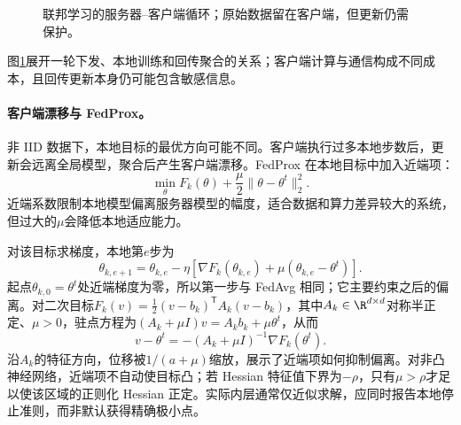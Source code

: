 \begin{figure}[htbp]
\centering
{}
\caption{联邦学习的服务器--客户端循环；原始数据留在客户端，但更新仍需保护。}
\label{fig:federated-training-round}
\end{figure}
图\ref{fig:federated-training-round}展开一轮下发、本地训练和回传聚合的关系；客户端计算与通信构成不同成本，且回传更新本身仍可能包含敏感信息。

\paragraph{客户端漂移与 FedProx。}
非 IID 数据下，本地目标的最优方向可能不同。客户端执行过多本地步数后，更新会远离全局模型，聚合后产生客户端漂移。FedProx 在本地目标中加入近端项：
\begin{equation}
 \min_\theta F_k(\theta)+\frac{\mu}{2}\|\theta-\theta^t\|_2^2.
\end{equation}
近端系数限制本地模型偏离服务器模型的幅度，适合数据和算力差异较大的系统，但过大的$\mu$会降低本地适应能力。

对该目标求梯度，本地第$e$步为
\begin{equation}
 \theta_{k,e+1}=\theta_{k,e}-\eta
 [\nabla F_k(\theta_{k,e})+\mu(\theta_{k,e}-\theta^t)].
\end{equation}
起点$\theta_{k,0}=\theta^t$处近端梯度为零，所以第一步与 FedAvg 相同；它主要约束之后的偏离。对二次目标$F_k(v)=\tfrac12(v-b_k)^{\mathsf T}A_k(v-b_k)$，其中$A_k\in\R^{d\times d}$对称半正定、$\mu>0$，驻点方程为$(A_k+\mu I)v=A_kb_k+\mu\theta^t$，从而
\begin{equation}
 v-\theta^t=-(A_k+\mu I)^{-1}\nabla F_k(\theta^t).
\end{equation}
沿$A_k$的特征方向，位移被$1/(a+\mu)$缩放，展示了近端项如何抑制偏离。对非凸神经网络，近端项不自动使目标凸；若 Hessian 特征值下界为$-\rho$，只有$\mu>\rho$才足以使该区域的正则化 Hessian 正定。实际内层通常仅近似求解，应同时报告本地停止准则，而非默认获得精确极小点。


